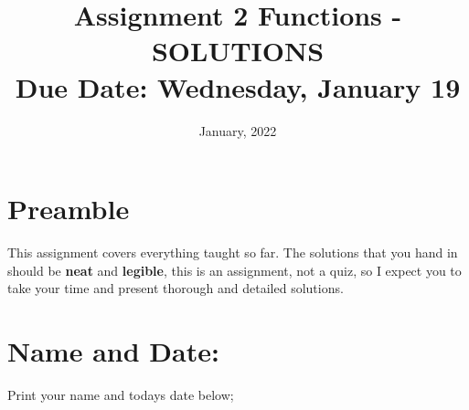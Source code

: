 \documentclass[12pt]{article} %
\title{\textbf{Assignment 2 Functions - SOLUTIONS} \\ \textbf{Due Date: } Wednesday, January 19}
\date{January, 2022}
\begin{document}
	\renewcommand*{\coursecode}{MATH 235} %
	\renewcommand*{\assgnnumber}{Assignment 1} %
	\renewcommand*{\submdate}{September 14, 2021} %
	\renewcommand*{\studentfname}{Abdullah} %
	\renewcommand*{\studentlname}{Zubair} %
    \renewcommand*{\proofname}{Proof:}

	\renewcommand\qedsymbol{$\blacksquare$}
	\setfigpath
	\fancyhfoffset[L,O]{0pt} %



\maketitle
	\section{Preamble}
  This assignment covers everything taught so far. The solutions that you hand in should be \textbf{neat} and \textbf{legible},
  this is an assignment, not a quiz, so I expect you to take your time and present thorough and detailed solutions.
\section{Name and Date:}
	Print your name and todays date below;\\
\end{document}

